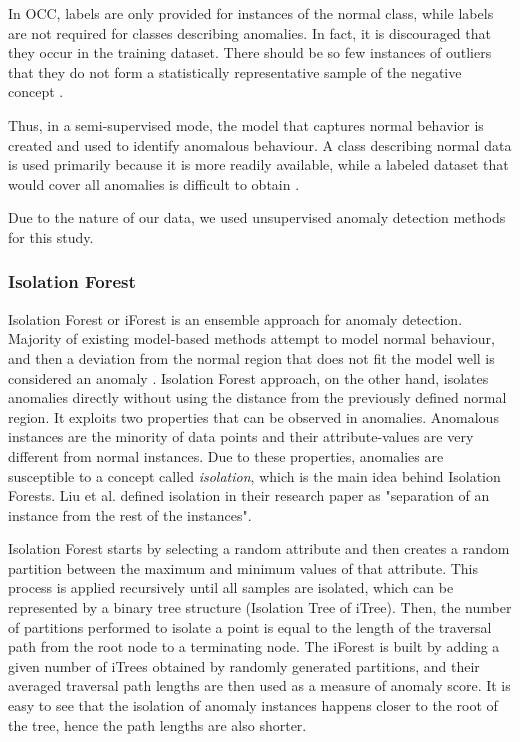 In OCC, labels are only provided for instances of the normal class, while labels are not required for classes describing anomalies. In fact, it is discouraged that they occur in the training dataset. There should be so few instances of outliers that they do not form a statistically representative sample of the negative concept \cite{khan_madden_2014}.
 
Thus, in a semi-supervised mode, the model that captures normal behavior is created and used to identify anomalous behaviour. A class describing normal data is used primarily because it is more readily available, while a labeled dataset that would cover all anomalies is difficult to obtain \cite{cvbakv2009}.
 
Due to the nature of our data, we used unsupervised anomaly detection methods for this study.

\subsubsection{Isolation Forest}
\label{section:lrIsolationForest}
Isolation Forest or iForest \cite{liu2012isolation} is an ensemble approach for anomaly detection. Majority of existing model-based methods attempt to model normal behaviour, and then a deviation from the normal region that does not fit the model well is considered an anomaly \cite{introToDataMining2005}. Isolation Forest approach, on the other hand, isolates anomalies directly without using the distance from the previously defined normal region. It exploits two properties that can be observed in anomalies. Anomalous instances are the minority of data points and their attribute-values are very different from normal instances. Due to these properties, anomalies are susceptible to a concept called \textit{isolation}, which is the main idea behind Isolation Forests. Liu et al. \cite{liu2012isolation} defined isolation in their research paper as "separation of an instance from the rest of the instances".

Isolation Forest starts by selecting a random attribute and then creates a random partition between the maximum and minimum values of that attribute. This process is applied recursively until all samples are isolated, which can be represented by a binary tree structure (Isolation Tree of iTree). Then, the number of partitions performed to isolate a point is equal to the length of the traversal path from the root node to a terminating node. The iForest is built by adding a given number of iTrees obtained by randomly generated partitions, and their averaged traversal path lengths are then used as a measure of anomaly score. It is easy to see that the isolation of anomaly instances happens closer to the root of the tree, hence the path lengths are also shorter.

